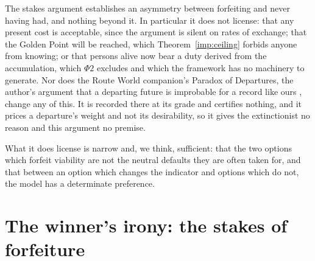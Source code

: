 \begin{remark}\label{hr:rem:stakeslimit}
The stakes argument establishes an asymmetry between forfeiting and
never having had, and nothing beyond it. In particular it does not
license: that any present cost is acceptable, since the argument is
silent on rates of exchange; that the Golden Point will be reached,
which Theorem~\ref{imp:ceiling} forbids anyone from knowing; or that
persons alive now bear a duty derived from the accumulation, which
$\Phi2$ excludes and which the framework has no machinery to generate.
Nor does the Route World companion's Paradox of Departures, the author's
argument that a departing future is improbable for a record like ours
\cite{GoldenRouteWorld}, change any of this. It is recorded there at its
grade and certifies nothing, and it prices a departure's weight and not
its desirability, so it gives the extinctionist no reason and this
argument no premise.

What it does license is narrow and, we think, sufficient: that the two
options which forfeit viability are not the neutral defaults they are
often taken for, and that between an option which changes the indicator
and options which do not, the model has a determinate preference.
\end{remark}


\section{The winner's irony: the stakes of forfeiture}\label{sec:irony}

